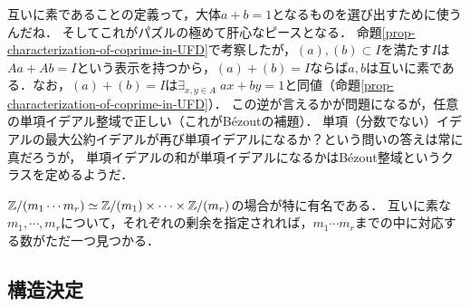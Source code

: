 \documentclass[uplatex,dvipdfmx]{jsreport}
\begin{document}
\begin{remarks}
    互いに素であることの定義って，大体$a+b=1$となるものを選び出すために使うんだね．
    そしてこれがパズルの極めて肝心なピースとなる．
    命題\ref{prop-characterization-of-coprime-in-UFD}で考察したが，$(a),(b)\subset I$を満たす$I$は$Aa+Ab=I$という表示を持つから，$(a)+(b)=I$ならば$a,b$は互いに素である．なお，$(a)+(b)=I$は$\exists_{x,y\in A}\;ax+by=1$と同値（命題\ref{prop-characterization-of-coprime-in-UFD}）．
    この逆が言えるかが問題になるが，任意の単項イデアル整域で正しい（これがBézoutの補題）．
    単項（分数でない）イデアルの最大公約イデアルが再び単項イデアルになるか？という問いの答えは常に真だろうが，
    単項イデアルの和が単項イデアルになるかはBézout整域というクラスを定めるようだ．
\end{remarks}

\begin{remark}
    $\mathbb{Z}/(m_1\cdots m_r)\simeq\mathbb{Z}/(m_1)\times\cdots\times\mathbb{Z}/(m_r)$の場合が特に有名である．
    互いに素な$m_1,\cdots,m_r$について，それぞれの剰余を指定されれば，$m_1\cdots m_r$までの中に対応する数がただ一つ見つかる．
\end{remark}

\subsection{構造決定}
\end{document}
